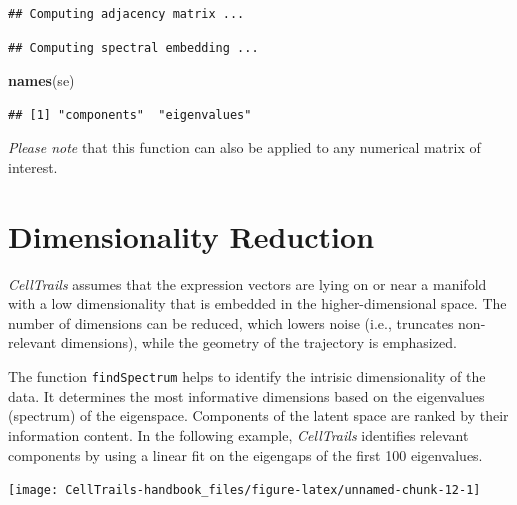 \documentclass[]{book}
\newenvironment{Shaded}{\begin{snugshade}}{\end{snugshade}}
\newcommand{\KeywordTok}[1]{\textcolor[rgb]{0.13,0.29,0.53}{\textbf{#1}}}
\newcommand{\DataTypeTok}[1]{\textcolor[rgb]{0.13,0.29,0.53}{#1}}
\newcommand{\DecValTok}[1]{\textcolor[rgb]{0.00,0.00,0.81}{#1}}
\newcommand{\StringTok}[1]{\textcolor[rgb]{0.31,0.60,0.02}{#1}}
\newcommand{\CommentTok}[1]{\textcolor[rgb]{0.56,0.35,0.01}{\textit{#1}}}
\newcommand{\OperatorTok}[1]{\textcolor[rgb]{0.81,0.36,0.00}{\textbf{#1}}}
\newcommand{\NormalTok}[1]{#1}
\theoremstyle{definition}
\theoremstyle{definition}
\theoremstyle{definition}
\theoremstyle{remark}
\begin{document}
\begin{verbatim}
## Computing adjacency matrix ...
\end{verbatim}

\begin{verbatim}
## Computing spectral embedding ...
\end{verbatim}

\begin{Shaded}
\begin{Highlighting}[]
\KeywordTok{names}\NormalTok{(se)}
\end{Highlighting}
\end{Shaded}

\begin{verbatim}
## [1] "components"  "eigenvalues"
\end{verbatim}

\emph{Please note} that this function can also be applied to any
numerical matrix of interest.

\section{Dimensionality Reduction}\label{dimensionality-reduction}

\emph{CellTrails} assumes that the expression vectors are lying on or
near a manifold with a low dimensionality that is embedded in the
higher-dimensional space. The number of dimensions can be reduced, which
lowers noise (i.e., truncates non-relevant dimensions), while the
geometry of the trajectory is emphasized.

The function \texttt{findSpectrum} helps to identify the intrisic
dimensionality of the data. It determines the most informative
dimensions based on the eigenvalues (spectrum) of the eigenspace.
Components of the latent space are ranked by their information content.
In the following example, \emph{CellTrails} identifies relevant
components by using a linear fit on the eigengaps of the first 100
eigenvalues.

\begin{Shaded}
\end{Shaded}

\texttt{[image: CellTrails-handbook\_files/figure-latex/unnamed-chunk-12-1]}
\end{document}
